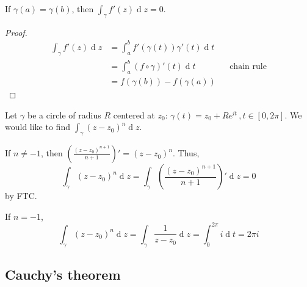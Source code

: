 \documentclass[12pt]{article}
\renewcommand{\d}{\ensuremath{\operatorname{d}}}
\begin{document}
If $\gamma(a)=\gamma(b)$, then $\int_{\gamma}f'(z)\d z=0$.

\begin{proof}
    \begin{align*}
        \int_{\gamma}f'(z)\d z&= \int_{a}^{b}f'(\gamma(t))\gamma'(t)\d t\\
        &= \int_{a}^{b}(f\circ \gamma)'(t)\d t &&\text{chain rule}\\
        &= f(\gamma(b))-f(\gamma(a))
    \end{align*}
\end{proof}

\eg Let $\gamma$ be a circle of radius $R$ centered at $z_0$: $\gamma(t)=z_0+Re^{it}\, ,t\in [0,2\pi]$. We would like to find \(\int_{\gamma}(z-z_0)^n\d z\).

If $n\neq -1$, then $\left(\frac{(z-z_0)^{n+1}}{n+1}\right)' = (z-z_0)^n$. Thus, \[\int_{\gamma}(z-z_0)^n\d z = \int_{\gamma}\left(\frac{(z-z_0)^{n+1}}{n+1}\right)'\d z =0\] by FTC. 

If $n=-1$, \[\int_{\gamma}(z-z_0)^n\d z= \int_{\gamma}\frac{1}{z-z_0}\d z = \int_{0}^{2\pi}i\d t=2\pi i\]

\subsection{Cauchy's theorem}
\end{document}
